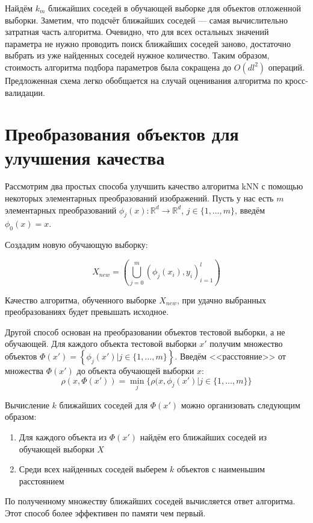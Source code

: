 \documentclass[12pt,fleqn]{article}
\newcommand{\real}{\mathbb{R}}
\begin{document}
Найдём $k_m$ ближайших соседей в обучающей выборке для объектов отложенной выборки.
Заметим, что подсчёт ближайших соседей --- самая вычислительно затратная часть алгоритма.
Очевидно, что для всех остальных значений параметра не нужно проводить поиск ближайших соседей заново, достаточно выбрать из уже найденных соседей нужное количество. 
Таким образом, стоимость алгоритма подбора параметров была сокращена до $O(dl^2)$ операций.
Предложенная схема легко обобщается на случай оценивания алгоритма по кросс-валидации. 

\section*{Преобразования объектов для улучшения качества}

Рассмотрим два простых способа улучшить качество алгоритма kNN с помощью некоторых элементарных преобразований изображений. 
Пусть у нас есть $m$ элементарных преобразований $\phi_j(x) : \real^d \rightarrow \real^d$, $j \in \{ 1, \ldots, m\}$, введём $\phi_0(x) = x$.


Создадим новую обучающую выборку:

\[ X_{new} =\left( \bigcup_{j = 0}^{m} \left(\phi_j(x_i), y_i\right)_{i=1}^{l} \right) \]

Качество алгоритма, обученного выборке $X_{new}$, при удачно выбранных преобразованиях будет превышать исходное.

Другой способ основан на преобразовании объектов тестовой выборки, а не обучающей.
Для каждого объекта тестовой выборки $x'$ получим множество объектов $\Phi(x') = \left\{\phi_j(x') | j \in \{ 1, \ldots, m\} \right\}$.
Введём <<расстояние>> от множества $\Phi(x')$ до объекта обучающей выборки $x$:
\[ \rho(x, \Phi(x')) = \min_{j} \{ \rho(x, \phi_j(x') | j \in \{ 1, \ldots, m\} \}\]

Вычисление $k$ ближайших соседей для $\Phi(x')$ можно организовать следующим образом:
\begin{enumerate}
    \item Для каждого объекта из $\Phi(x')$ найдём его ближайших соседей из обучающей выборки $X$
    \item Среди всех найденных соседей выберем $k$ объектов с наименьшим расстоянием
\end{enumerate}

По полученному множеству ближайших соседей вычисляется ответ алгоритма. Этот способ более эффективен по памяти чем первый.
\end{document}
